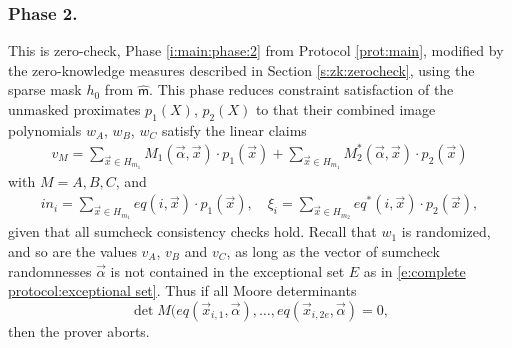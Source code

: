 \subsubsection{Phase 2.}
This is zero-check, Phase \ref{i:main:phase:2} from Protocol \ref{prot:main}, modified by the zero-knowledge measures described in Section \ref{s:zk:zerocheck}, using the sparse mask $h_0$ from $\hat{\mathsf m}$.
This phase reduces constraint satisfaction of the unmasked proximates $p_1(X)$, $p_2(X)$ to that their combined image polynomials $w_A$, $w_B$, $w_C$ satisfy the linear claims 
\begin{align}
\label{e:zkIOPP:phase3:claim:vM}
v_M = \sum_{\vec x\in H_{m_1}} M_1(\vec\alpha, \vec x) \cdot p_1(\vec x) + \sum_{\vec x\in H_{m_1}} M_2^*(\vec\alpha,\vec x)\cdot p_2(\vec x)
\end{align}
with $M = A,B,C$, and
\begin{align}
\label{e:zkIOPP:phase3:claim:inputs}
in_i = \sum_{\vec x \in H_{m_1}} eq(i, \vec x) \cdot p_1(\vec x),
\quad 
\xi_i = \sum_{\vec x \in H_{m_2}} eq^*(i, \vec x) \cdot p_2(\vec x),
\end{align}
given that all sumcheck consistency checks hold.
Recall that $w_1$ is randomized, and so are the values $v_A$, $v_B$ and $v_C$, as long as the vector of sumcheck randomnesses $\vec\alpha$ is not contained in the exceptional set $E$ as in \eqref{e:complete protocol:exceptional set}. 
Thus if all Moore determinants
\[
\det M(eq(\vec x_{i,1},\vec\alpha), \ldots, eq(\vec x_{i,2e},\vec\alpha) = 0,
\]
then the prover aborts. 

